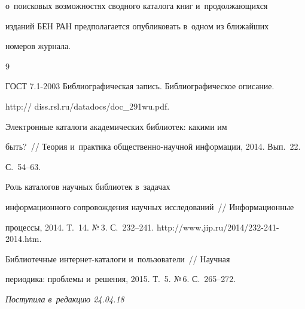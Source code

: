 о~поисковых возможностях сводного каталога книг и~продолжающихся 


изданий БЕН РАН предполагается опубликовать в~одном из ближайших 


номеров журнала.


  


{\small\frenchspacing


{%




\begin{thebibliography}{9}




ГОСТ 7.1-2003 Библиографическая запись. Библиографическое описание. {\sf 


http:// diss.rsl.ru/datadocs/doc\_291wu.pdf.}




 Электронные каталоги академических библиотек: какими им 


быть?~/\!\!/ Теория и~практика об\-ще\-ст\-вен\-но-на\-уч\-ной информации, 2014. Вып.~22. 


С.~54--63.




 Роль каталогов научных библиотек в~задачах 


информационного сопровождения научных исследований~/\!\!/ Информационные 


процессы, 2014. Т.~14. №\,3. С.~232--241. {\sf http://www.jip.ru/2014/232-241-2014.htm}.




 Библиотечные интернет-каталоги и~пользователи~/\!\!/ Научная 


периодика: проблемы и~решения, 2015. Т.~5. №\,6. С.~265--272.


        \end{thebibliography}


} }








\vspace*{-3pt}





\hfill{\small\textit{Поступила в~редакцию 24.04.18}}














